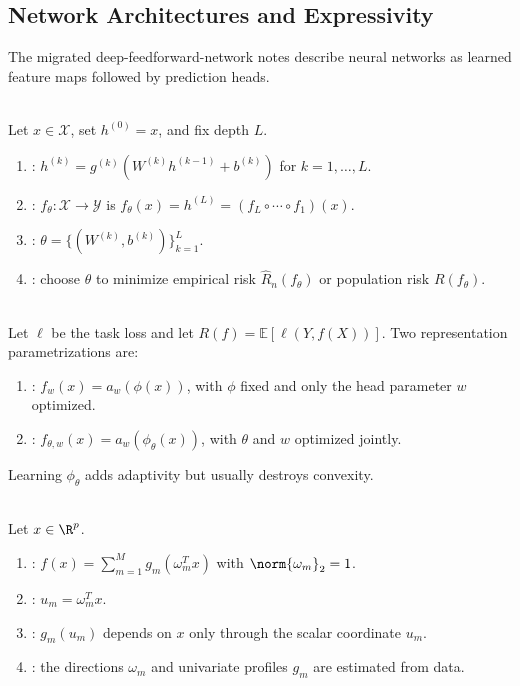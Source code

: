 \subsection{Network Architectures and Expressivity}

The migrated deep-feedforward-network notes describe neural networks as learned feature maps followed by prediction heads.

\begin{definition} \label{def:sl-feedforward-network} \\
Let $x\in\mathcal X$, set $h^{(0)}=x$, and fix depth $L$.
\begin{enumerate}[label=(\roman*)]
\setlength{\itemsep}{0pt}
\item {}: $h^{(k)}=g^{(k)}(W^{(k)}h^{(k-1)}+b^{(k)})$ for $k=1,\ldots,L$.
\item {}: $f_\theta:\mathcal X\to\mathcal Y$ is $f_\theta(x)=h^{(L)}=(f_L\circ\cdots\circ f_1)(x)$.
\item {}: $\theta=\{(W^{(k)},b^{(k)})\}_{k=1}^L$.
\item {}: choose $\theta$ to minimize empirical risk $\hat R_n(f_\theta)$ or population risk $R(f_\theta)$.
\end{enumerate}
\end{definition}

\begin{remark} \label{rem:sl-learned-feature-map} \\
Let $\ell$ be the task loss and let $R(f)=\mathbb E[\ell(Y,f(X))]$. Two representation parametrizations are:
\begin{enumerate}[label=(\roman*)]
\setlength{\itemsep}{0pt}
\item {}: $f_w(x)=a_w(\phi(x))$, with $\phi$ fixed and only the head parameter $w$ optimized.
\item {}: $f_{\theta,w}(x)=a_w(\phi_\theta(x))$, with $\theta$ and $w$ optimized jointly.
\end{enumerate}
Learning $\phi_\theta$ adds adaptivity but usually destroys convexity.
\end{remark}

\begin{definition} \label{def:sl-projection-pursuit-ridge-functions} \\
Let $x\in\R^p$.
\begin{enumerate}[label=(\roman*)]
\setlength{\itemsep}{0pt}
\item {}: $f(x)=\sum\limits_{m=1}^M g_m(\omega_m^Tx)$ with $\norm{\omega_m}_2=1$.
\item {}: $u_m=\omega_m^Tx$.
\item {}: $g_m(u_m)$ depends on $x$ only through the scalar coordinate $u_m$.
\item {}: the directions $\omega_m$ and univariate profiles $g_m$ are estimated from data.
\end{enumerate}
\end{definition}

